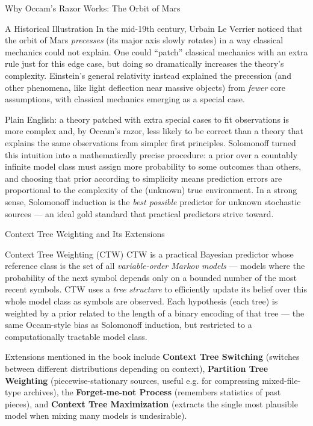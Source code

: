 \documentclass[aspectratio=169,10pt]{beamer}
\begin{document}
\begin{frame}{Why Occam's Razor Works: The Orbit of Mars}
  \begin{block}{A Historical Illustration}
    In the mid-19th century, Urbain Le Verrier noticed that the orbit of
    Mars \emph{precesses} (its major axis slowly rotates) in a way classical
    mechanics could not explain. One could ``patch'' classical mechanics
    with an extra rule just for this edge case, but doing so dramatically
    increases the theory's complexity. Einstein's general relativity instead
    explained the precession (and other phenomena, like light deflection
    near massive objects) from \emph{fewer} core assumptions, with classical
    mechanics emerging as a special case.
  \end{block}
  Plain English: a theory patched with extra special cases to fit
  observations is more complex and, by Occam's razor, less likely to be
  correct than a theory that explains the same observations from simpler
  first principles. Solomonoff turned this intuition into a mathematically
  precise procedure: a prior over a countably infinite model class must
  assign more probability to some outcomes than others, and choosing that
  prior according to simplicity means prediction errors are proportional to
  the complexity of the (unknown) true environment. In a strong sense,
  Solomonoff induction is the \emph{best possible} predictor for unknown
  stochastic sources --- an ideal gold standard that practical predictors
  strive toward.
\end{frame}

\begin{frame}{Context Tree Weighting and Its Extensions}
  \begin{block}{Context Tree Weighting (CTW)}
    CTW is a practical Bayesian predictor whose reference class is the set
    of all \emph{variable-order Markov models} --- models where the
    probability of the next symbol depends only on a bounded number of the
    most recent symbols. CTW uses a \emph{tree structure} to efficiently
    update its belief over this whole model class as symbols are observed.
    Each hypothesis (each tree) is weighted by a prior related to the length
    of a binary encoding of that tree --- the same Occam-style bias as
    Solomonoff induction, but restricted to a computationally tractable
    model class.
  \end{block}
  Extensions mentioned in the book include \textbf{Context Tree Switching}
  (switches between different distributions depending on context),
  \textbf{Partition Tree Weighting} (piecewise-stationary sources, useful
  e.g. for compressing mixed-file-type archives), the \textbf{Forget-me-not
  Process} (remembers statistics of past pieces), and \textbf{Context Tree
  Maximization} (extracts the single most plausible model when mixing many
  models is undesirable).
\end{frame}
\end{document}
